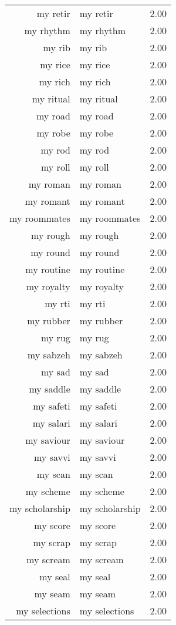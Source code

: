 \begin{table}[ht]
\begin{tabular}{rlr}
  my retir & my retir & 2.00 \\ 
  my rhythm & my rhythm & 2.00 \\ 
  my rib & my rib & 2.00 \\ 
  my rice & my rice & 2.00 \\ 
  my rich & my rich & 2.00 \\ 
  my ritual & my ritual & 2.00 \\ 
  my road & my road & 2.00 \\ 
  my robe & my robe & 2.00 \\ 
  my rod & my rod & 2.00 \\ 
  my roll & my roll & 2.00 \\ 
  my roman & my roman & 2.00 \\ 
  my romant & my romant & 2.00 \\ 
  my roommates & my roommates & 2.00 \\ 
  my rough & my rough & 2.00 \\ 
  my round & my round & 2.00 \\ 
  my routine & my routine & 2.00 \\ 
  my royalty & my royalty & 2.00 \\ 
  my rti & my rti & 2.00 \\ 
  my rubber & my rubber & 2.00 \\ 
  my rug & my rug & 2.00 \\ 
  my sabzeh & my sabzeh & 2.00 \\ 
  my sad & my sad & 2.00 \\ 
  my saddle & my saddle & 2.00 \\ 
  my safeti & my safeti & 2.00 \\ 
  my salari & my salari & 2.00 \\ 
  my saviour & my saviour & 2.00 \\ 
  my savvi & my savvi & 2.00 \\ 
  my scan & my scan & 2.00 \\ 
  my scheme & my scheme & 2.00 \\ 
  my scholarship & my scholarship & 2.00 \\ 
  my score & my score & 2.00 \\ 
  my scrap & my scrap & 2.00 \\ 
  my scream & my scream & 2.00 \\ 
  my seal & my seal & 2.00 \\ 
  my seam & my seam & 2.00 \\ 
  my selections & my selections & 2.00 \\ 

\end{tabular}
\end{table}
